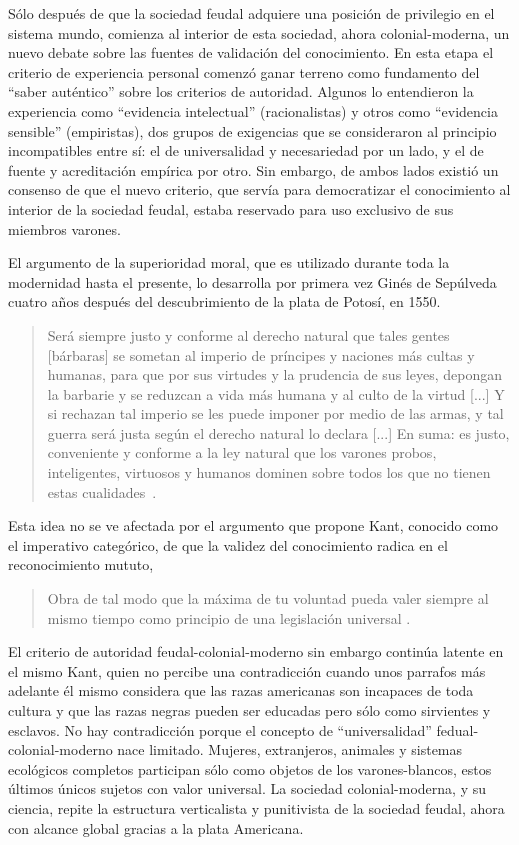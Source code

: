 \documentclass[a4paper,10pt]{book}
\begin{document}

Sólo después de que la sociedad feudal adquiere una posición de privilegio en el sistema mundo, comienza al interior de esta sociedad, ahora colonial-moderna, un nuevo debate sobre las fuentes de validación del conocimiento.
En esta etapa el criterio de experiencia personal comenzó ganar terreno como fundamento del ``saber auténtico'' sobre los criterios de autoridad.
Algunos lo entendieron la experiencia como ``evidencia intelectual'' (racionalistas) y otros como ``evidencia sensible'' (empiristas), dos grupos de exigencias que se consideraron al principio incompatibles entre sí: el de universalidad y necesariedad por un lado, y el de fuente y acreditación empírica por otro.
Sin embargo, de ambos lados existió un consenso de que el nuevo criterio, que servía para democratizar el conocimiento al interior de la sociedad feudal, estaba reservado para uso exclusivo de sus miembros varones.


El argumento de la superioridad moral, que es utilizado durante toda la modernidad hasta el presente, lo desarrolla por primera vez Ginés de Sepúlveda cuatro años después del descubrimiento de la plata de Potosí, en 1550.
\begin{quotation}
 Será siempre justo y conforme al derecho natural que tales gentes [bárbaras] se sometan al imperio de príncipes y naciones más cultas y humanas, para que por sus virtudes y la prudencia de sus leyes, depongan la barbarie y se reduzcan a vida más humana y al culto de la virtud [...] Y si rechazan tal imperio se les puede imponer por medio de las armas, y tal guerra será justa según el derecho natural lo declara [...] En suma: es justo, conveniente y conforme a la ley natural que los varones probos, inteligentes, virtuosos y humanos dominen sobre todos los que no tienen estas cualidades~\cite{GinesdeSepulveda1967p87}.
\end{quotation}
Esta idea no se ve afectada por el argumento que propone Kant, conocido como el imperativo categórico, de que la validez del conocimiento radica en el reconocimiento mututo,
\begin{quotation}
Obra de tal modo que la máxima de tu voluntad pueda valer siempre al mismo tiempo como principio de una legislación universal \cite{Kant2003:28}.
\end{quotation}
El criterio de autoridad feudal-colonial-moderno sin embargo continúa latente en el mismo Kant, quien no percibe una contradicción cuando unos parrafos más adelante él mismo considera que las razas americanas son incapaces de toda cultura y que las razas negras pueden ser educadas pero sólo como sirvientes y esclavos.
No hay contradicción porque el concepto de ``universalidad'' fedual-colonial-moderno nace limitado.
Mujeres, extranjeros, animales y sistemas ecológicos completos participan sólo como objetos de los varones-blancos, estos últimos únicos sujetos con valor universal.
La sociedad colonial-moderna, y su ciencia, repite la estructura verticalista y punitivista de la sociedad feudal, ahora con alcance global gracias a la plata Americana.
\end{document}
